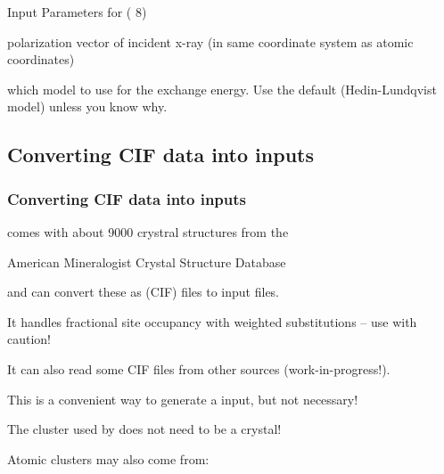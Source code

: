 {\begin{slide}{Input Parameters for {  ({\feff} 8)}}
\begin{cenpage}{100mm}
\begin{description}[POTENTIALSXX]
  \item[{\Blue{\texttt{POLARIZATION}}}]   polarization vector of incident
    x-ray (in same coordinate system as atomic coordinates)

  \item[{\Blue{\texttt{EXCHANGE}}}]   which model to use for the exchange energy.
    Use the default (Hedin-Lundqvist model) unless you know why.

  \end{description}

\end{cenpage}

\end{slide}



\subsection{ Converting CIF data into {\feff} inputs}
\begin{frame}[fragile] \frametitle{Converting CIF data into {\feff} inputs}

\begin{cenpage}{95mm}

  {\larch} comes with about 9000 crystral structures from the 

\end{cenpage}

  \begin{cenpage}{75mm}
    American Mineralogist Crystal Structure Database 
  \end{cenpage}

\begin{cenpage}{95mm}


  and can convert these as {}
  (CIF) files to {\feff} input files.

  \vmm
  It handles fractional site occupancy with weighted substitutions -- use
  with caution!

  \vmm
  It can also read some CIF files from other sources (work-in-progress!).

  \vmm
  This is a convenient way to generate a {\feff} input, but not necessary!

\begin{postitbox}{84mm}
  The cluster used by {\feff} does not need to be a crystal!
\end{postitbox}

\vmm
Atomic clusters may also come from:


\end{cenpage}
\end{frame}}
